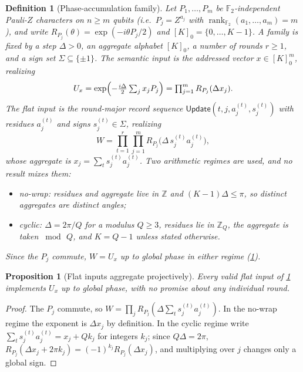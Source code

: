 \documentclass[a4paper,twocolumn,10pt,unpublished]{quantumarticle}
\newtheorem{definition}{Definition}
\newtheorem{proposition}{Proposition}
\newcommand{\Ftwo}{\mathbb{F}_2}
\begin{document}
\begin{definition}[Phase-accumulation family]
\label{def:phase-family}
Let $P_1,\ldots,P_m$ be $\Ftwo$-independent Pauli-$Z$ characters on
$n\geq m$ qubits (i.e.\ $P_j=Z^{a_j}$ with
$\operatorname{rank}_{\Ftwo}(a_1,\ldots,a_m)=m$), and write
$R_{P_j}(\theta)=\exp(-i\theta P_j/2)$ and $[K]_0=\{0,\ldots,K-1\}$.  A
family is fixed by a step $\Delta>0$, an aggregate alphabet $[K]_0$, a
number of rounds $r\geq1$, and a sign set $\Sigma\subseteq\{\pm1\}$.  The
\emph{semantic input} is the addressed vector $x\in[K]_0^m$, realizing
\begin{equation}\label{eq:Ux-def}
 U_x=\exp\Bigl(-\tfrac{i\Delta}{2}\textstyle\sum_{j}x_jP_j\Bigr)
    =\prod_{j=1}^{m}R_{P_j}(\Delta x_j).
\end{equation}
The \emph{flat input} is the round-major record sequence
$\mathsf{Update}(t,j,a_j^{(t)},s_j^{(t)})$ with residues $a_j^{(t)}$ and
signs $s_j^{(t)}\in\Sigma$, realizing
\begin{equation}\label{eq:family-flat}
 W=\prod_{t=1}^{r}\prod_{j=1}^{m}R_{P_j}\bigl(\Delta\,s_j^{(t)}a_j^{(t)}\bigr),
\end{equation}
whose aggregate is $x_j=\sum_{t}s_j^{(t)}a_j^{(t)}$.  Two arithmetic
regimes are used, and no result mixes them:
\begin{itemize}[leftmargin=1.4em,topsep=2pt,itemsep=1pt]
\item \emph{no-wrap}: residues and aggregate live in $\mathbb Z$ and
$(K-1)\Delta\leq\pi$, so distinct aggregates are distinct angles;
\item \emph{cyclic}: $\Delta=2\pi/Q$ for a modulus $Q\geq3$, residues lie
in $\mathbb Z_Q$, the aggregate is taken $\bmod\,Q$, and $K=Q-1$ unless
stated otherwise.
\end{itemize}
Since the $P_j$ commute, $W=U_x$ up to global phase in either regime
(\cref{prop:family-aggregates}).
\end{definition}

\begin{proposition}[Flat inputs aggregate projectively]
\label{prop:family-aggregates}
Every valid flat input of \cref{def:phase-family} implements $U_x$ up to
global phase, with no promise about any individual round.
\end{proposition}

\begin{proof}
The $P_j$ commute, so $W=\prod_jR_{P_j}(\Delta\sum_ts_j^{(t)}a_j^{(t)})$.
In the no-wrap regime the exponent is $\Delta x_j$ by definition.  In the
cyclic regime write $\sum_ts_j^{(t)}a_j^{(t)}=x_j+Qk_j$ for integers
$k_j$; since $Q\Delta=2\pi$, $R_{P_j}(\Delta x_j+2\pi k_j)
=(-1)^{k_j}R_{P_j}(\Delta x_j)$, and multiplying over $j$ changes only a
global sign.
\end{proof}
\end{document}
